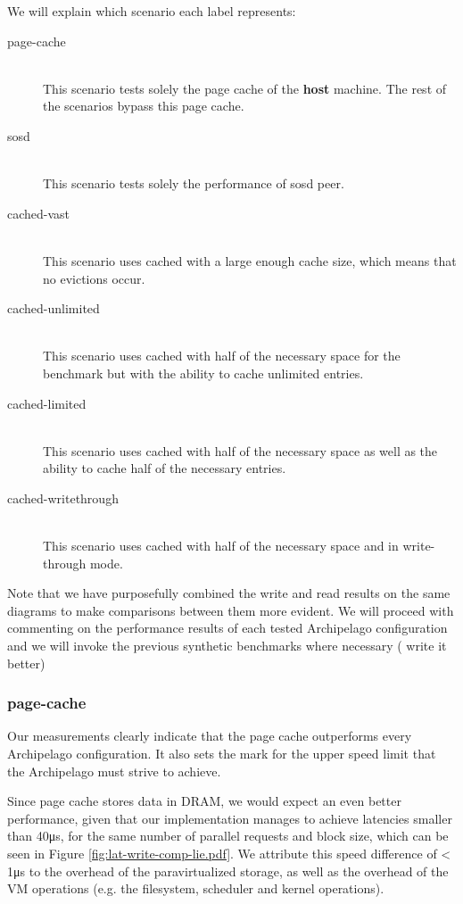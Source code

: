 

We will explain which scenario each label represents:

\begin{description}
	\item[page-cache] \hfill \\
		This scenario tests solely the page cache of the \textbf{host} machine.  
		The rest of the scenarios bypass this page cache.
	\item[sosd] \hfill \\
		This scenario tests solely the performance of sosd peer.
	\item[cached-vast] \hfill \\
		This scenario uses cached with a large enough cache size, which means 
		that no evictions occur.
	\item[cached-unlimited] \hfill \\
		This scenario uses cached with half of the necessary space for the 
		benchmark but with the ability to cache unlimited entries.
	\item[cached-limited] \hfill \\
		This scenario uses cached with half of the necessary space as well as 
		the ability to cache half of the necessary entries.
	\item[cached-writethrough] \hfill \\
		This scenario uses cached with half of the necessary space and in 
		write-through mode.
\end{description}

		
Note that we have purposefully combined the write and read results on the same 
diagrams to make comparisons between them more evident. We will proceed with 
commenting on the performance results of each tested Archipelago configuration 
and we will invoke the previous synthetic benchmarks where necessary (\fixme 
write it better)

\subsubsection{page-cache}

Our measurements clearly indicate that the page cache outperforms every 
Archipelago configuration. It also sets the mark for the upper speed limit that 
the Archipelago must strive to achieve.

Since page cache stores data in DRAM, we would expect an even better 
performance, given that our implementation manages to achieve latencies smaller
than 40μs, for the same number of parallel requests and block size, which can 
be seen in Figure \ref{fig:lat-write-comp-lie.pdf}.  We attribute this speed 
difference of < 1μs to the overhead of the paravirtualized storage, as well as 
the overhead of the VM operations (e.g. the filesystem, scheduler and kernel 
operations).


